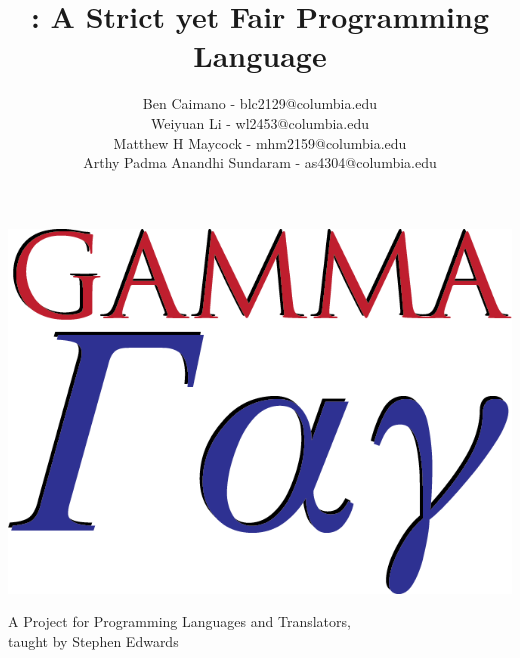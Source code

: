 \documentclass[10pt]{article}
\title{\Lang{}: A Strict yet Fair Programming Language}
\author{
	Ben Caimano - blc2129@columbia.edu \\
	Weiyuan Li - wl2453@columbia.edu \\
	Matthew H Maycock - mhm2159@columbia.edu \\
	Arthy Padma Anandhi Sundaram - as4304@columbia.edu
}
\date{}
\begin{document}
\noindent\includegraphics[width=\textwidth]{logo.png}
\pagebreak

\maketitle
\begin{center}
\large
A Project for Programming Languages and Translators,
\\taught by Stephen Edwards
\end{center}



\pagebreak

\tableofcontents














\end{document}
